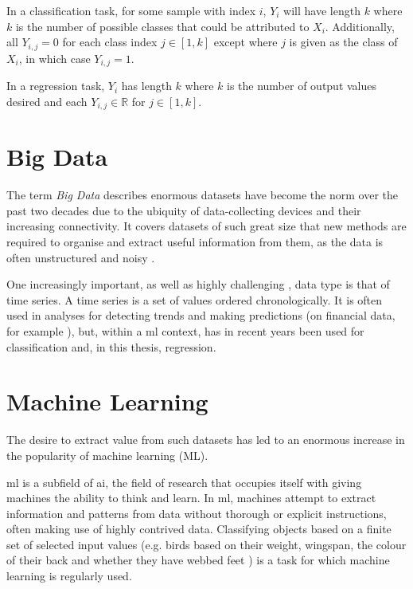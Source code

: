 In a classification task, for some sample with index \(i\), \(Y_i\) will have length \(k\) where \(k\) is the number of possible classes that could be attributed to \(X_i\). Additionally, all \(Y_{i,j} = 0\) for each class index \(j \in \left[1, k\right]\) except where \(j\) is given as the class of \(X_i\), in which case \(Y_{i,j} = 1\).

In a regression task, \(Y_i\) has length \(k\) where \(k\) is the number of output values desired and each \(Y_{i,j} \in \mathbb{R}\) for \(j \in \left[1, k\right]\).

\section{Big Data}
The term \textit{Big Data} describes enormous datasets have become the norm over the past two decades due to the ubiquity of data-collecting devices and their increasing connectivity. It covers datasets of such great size that new methods are required to organise and extract useful information from them, as the data is often unstructured and noisy \cite[]{fan_mining_2013,chen_big_2014}.

One increasingly important, as well as highly challenging \cite[]{yang_10_2006}, data type is that of time series. A time series is a set of values ordered chronologically. It is often used in analyses for detecting trends and making predictions (on financial data, for example \cite[]{krollner_financial_2010}), but, within a \ac{ml} context, has in recent years been used for classification \cite[]{dau_ucr_2019,ismail_fawaz_deep_2019} and, in this thesis, regression.

\section{Machine Learning}
The desire to extract value from such datasets has led to an enormous increase in the popularity of machine learning (ML).

\ac{ml} is a subfield of \ac{ai}, the field of research that occupies itself with giving machines the ability to think and learn. In \ac{ml}, machines attempt to extract information and patterns from data without thorough or explicit instructions, often making use of highly contrived data. Classifying objects based on a finite set of selected input values (e.g. birds based on their weight, wingspan, the colour of their back and whether they have webbed feet \cite[]{harrington_machine_2012}) is a task for which machine learning is regularly used.

